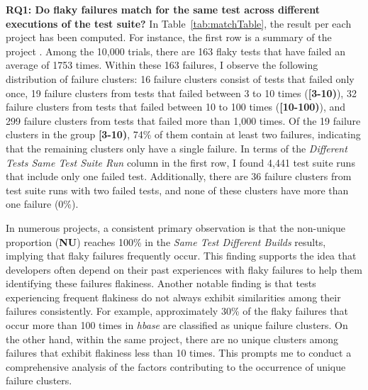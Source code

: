 

\textbf{RQ1: Do flaky failures match for the same test across different executions of the test suite?} In Table~\ref{tab:matchTable}, the result per each project has been computed. For instance, the first row is a summary of the project \spring. Among the 10,000 trials, there are 163 flaky tests that have failed an average of 1753 times. Within these 163 failures, I observe the following distribution of failure clusters: 16 failure clusters consist of tests that failed only once, 19 failure clusters from tests that failed between 3 to 10 times (\textbf{[3-10)}), 32 failure clusters from tests that failed between 10 to 100 times (\textbf{[10-100)}), and 299 failure clusters from tests that failed more than 1,000 times.
Of the 19 failure clusters in the group \textbf{[3-10)}, 74\% of them contain at least two failures, indicating that the remaining clusters only have a single failure.
In terms of the \emph{Different Tests Same Test Suite Run} column in the first row, I found 4,441 test suite runs that include only one failed test. Additionally, there are 36 failure clusters from test suite runs with two failed tests, and none of these clusters have more than one failure (0\%).


In numerous projects, a consistent primary observation is that the non-unique proportion (\textbf{NU}) reaches 100\% in the \emph{Same Test Different Builds} results, implying that flaky failures frequently occur. This finding supports the idea that developers often depend on their past experiences with flaky failures to help them identifying these failures flakiness.
Another notable finding is that tests experiencing frequent flakiness do not always exhibit similarities among their failures consistently. For example, approximately 30\% of the flaky failures that occur more than 100 times in \emph{hbase} are classified as unique failure clusters. On the other hand, within the same project, there are no unique clusters among failures that exhibit flakiness less than 10 times. This prompts me to conduct a comprehensive analysis of the factors contributing to the occurrence of unique failure clusters.

